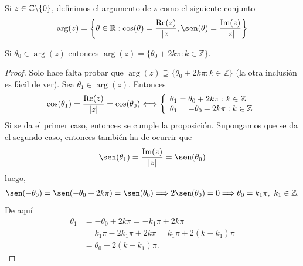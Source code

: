 \begin{defi}
    Si $z \in \mathbb{C} \backslash \{0\}$, definimos el argumento de z como el siguiente conjunto
    \begin{align*}
        \arg(z) = \left\{ \theta \in \mathbb{R} : \cos(\theta) = \frac{\re(z)}{|z|}, \sen(\theta) = \frac{\im(z)}{|z|} \right\}
    \end{align*}
\end{defi}

\begin{prop}
    Si $\theta_0 \in \arg(z)$ entonces $\arg(z) = \{ \theta_0 + 2k\pi : k \in \mathbb{Z} \}$.
\end{prop}

\begin{proof}
    Solo hace falta probar que $\arg(z) \supseteq \{ \theta_0 + 2k\pi : k \in \mathbb{Z} \}$ (la otra inclusión es fácil de ver). Sea $\theta_1 \in \arg(z)$. Entonces
    \begin{align*}
        \cos(\theta_1) = \frac{\text{Re}(z)}{|z|} = \cos(\theta_0) \Longleftrightarrow \left\{ \begin{array}{lcc}
                                                                                             \theta_1 = \theta_0 + 2k\pi : k \in \mathbb{Z}  \\
                                                                                             \theta_1 = -\theta_0 + 2k\pi : k \in \mathbb{Z} \\
                                                                                         \end{array}
        \right.
    \end{align*}
    Si se da el primer caso, entonces se cumple la proposición. Supongamos que se da el segundo caso, entonces también ha de ocurrir que
    \begin{align*}
        \sen(\theta_1) = \frac{\im(z)}{|z|} = \sen(\theta_0)
    \end{align*}
    luego,
    \begin{align*}
        \sen(-\theta_0) = \sen(-\theta_0 + 2k\pi) = \sen(\theta_0) \Longrightarrow 2\sen(\theta_0) = 0 \Longrightarrow \theta_0 = k_1\pi, \  k_1 \in \mathbb{Z}.
    \end{align*}
    De aquí
    \begin{align*}
        \theta_1 & = -\theta_0 + 2k\pi = -k_1\pi + 2k\pi               \\
                 & = k_1\pi - 2k_1\pi + 2k\pi = k_1\pi + 2(k - k_1)\pi \\
                 & = \theta_0 + 2(k - k_1)\pi.
    \end{align*}
\end{proof}

